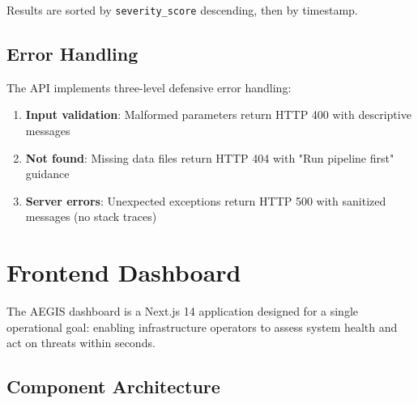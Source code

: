 \documentclass[12pt,a4paper]{article}
\begin{document}
Results are sorted by \texttt{severity\_score} descending, then by timestamp.

\subsection{Error Handling}

The API implements three-level defensive error handling:

\begin{enumerate}[noitemsep]
    \item \textbf{Input validation}: Malformed parameters return HTTP 400 with descriptive messages
    \item \textbf{Not found}: Missing data files return HTTP 404 with "Run pipeline first" guidance
    \item \textbf{Server errors}: Unexpected exceptions return HTTP 500 with sanitized messages (no stack traces)
\end{enumerate}

\section{Frontend Dashboard}

The AEGIS dashboard is a Next.js 14 application designed for a single operational goal: enabling infrastructure operators to assess system health and act on threats within seconds.

\subsection{Component Architecture}
\end{document}
